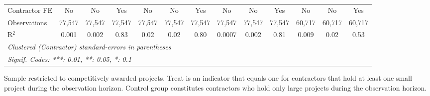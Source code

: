 \documentclass[
]{article}
\begin{document}
\begin{table}[htbp]
\begin{tabular}{lcccccccccccc}
      Contractor FE                & No           & No           & Yes         & No            & No            & Yes           & No           & No     & Yes    & No            & No           & Yes\\  
      Observations                 & 77,547       & 77,547       & 77,547      & 77,547        & 77,547        & 77,547        & 77,547       & 77,547 & 77,547 & 60,717        & 60,717       & 60,717\\  
      R$^2$                        & 0.001        & 0.002        & 0.83        & 0.02          & 0.02          & 0.80          & 0.0007       & 0.002  & 0.81   & 0.009         & 0.02         & 0.53\\  
      \midrule
      \multicolumn{13}{l}{\emph{Clustered (Contractor) standard-errors in parentheses}}\\
      \multicolumn{13}{l}{\emph{Signif. Codes: ***: 0.01, **: 0.05, *: 0.1}}\\
   \end{tabular}
   
   \par \raggedright 
   Sample restricted to competitively awarded projects. Treat is an indicator that equals one for contractors that hold at least one small project during the observation horizon. Control group constitutes contractors who hold only large projects during the observation horizon.
\end{table}
\end{document}
